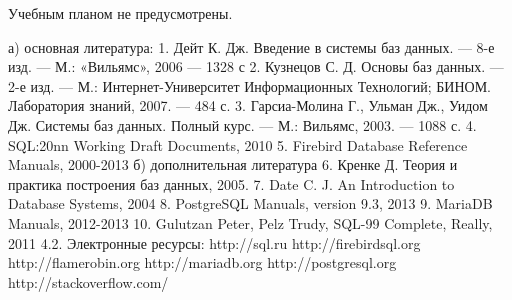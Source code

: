 \documentclass[a4paper]{article}
\begin{document}
Учебным планом не предусмотрены.

\CourseLiteratureSection
%
\nocite{*}
\printbibliography

а) основная литература:
1.  Дейт К. Дж. Введение в системы баз данных. — 8-е изд. — М.: «Вильямс», 2006 — 1328 с
2.  Кузнецов С. Д. Основы баз данных. — 2-е изд. — М.: Интернет-Университет Информационных Технологий; БИНОМ. Лаборатория знаний, 2007. — 484 с.
3.  Гарсиа-Молина Г., Ульман Дж., Уидом Дж. Системы баз данных. Полный курс. — М.: Вильямс, 2003. — 1088 с.
4.  SQL:20nn Working Draft Documents, 2010
5.  Firebird Database Reference Manuals, 2000-2013
б) дополнительная литература
6.  Кренке Д. Теория и практика построения баз данных, 2005.
7.  Date C. J. An Introduction to Database Systems, 2004
8.  PostgreSQL Manuals, version 9.3, 2013
9.  MariaDB Manuals, 2012-2013
10.  Gulutzan Peter,  Pelz Trudy, SQL-99 Complete, Really, 2011
4.2. Электронные  ресурсы:
http://sql.ru
http://firebirdsql.org
http://flamerobin.org
http://mariadb.org
http://postgresql.org
http://stackoverflow.com/
\end{document}
